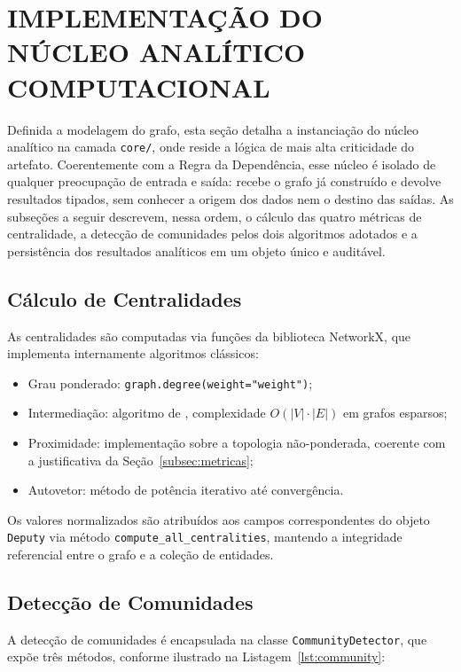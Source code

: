 \documentclass[
      12pt,
      a4paper,
      openright,
      oneside,
      chapter=TITLE,
      section=TITLE,
      english,
      french,
      spanish,
      brazilian
    ]{abntex2}
\begin{document}
    \section{IMPLEMENTAÇÃO DO NÚCLEO ANALÍTICO COMPUTACIONAL}

    Definida a modelagem do grafo, esta seção detalha a instanciação do núcleo analítico na camada \texttt{core/}, onde reside a lógica de mais alta criticidade do artefato. Coerentemente com a Regra da Dependência, esse núcleo é isolado de qualquer preocupação de entrada e saída: recebe o grafo já construído e devolve resultados tipados, sem conhecer a origem dos dados nem o destino das saídas. As subseções a seguir descrevem, nessa ordem, o cálculo das quatro métricas de centralidade, a detecção de comunidades pelos dois algoritmos adotados e a persistência dos resultados analíticos em um objeto único e auditável.

    \subsection{Cálculo de Centralidades}
    
    As centralidades são computadas via funções da biblioteca NetworkX, que implementa internamente algoritmos clássicos:
    
    \begin{itemize}
        \item Grau ponderado: \texttt{graph.degree(weight="weight")};
        \item Intermediação: algoritmo de , complexidade $O(|V| \cdot |E|)$ em grafos esparsos;
        \item Proximidade: implementação sobre a topologia não-ponderada, coerente com a justificativa da Seção~\ref{subsec:metricas};
        \item Autovetor: método de potência iterativo até convergência.
    \end{itemize}
    
    Os valores normalizados são atribuídos aos campos correspondentes do objeto \texttt{Deputy} via método \texttt{compute\_all\_centralities}, mantendo a integridade referencial entre o grafo e a coleção de entidades.
    
    \subsection{Detecção de Comunidades}
    
    A detecção de comunidades é encapsulada na classe \texttt{CommunityDetector}, que expõe três métodos, conforme ilustrado na Listagem~\ref{lst:community}:
    
\end{document}
